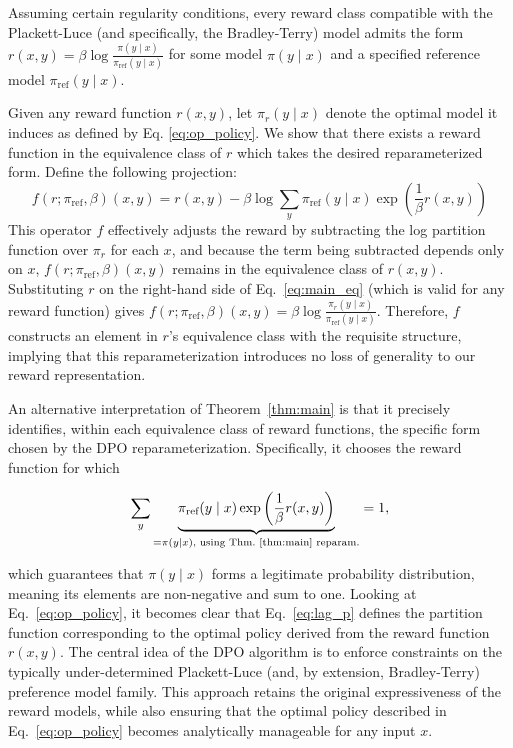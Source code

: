 \begin{theorem}\label{thm:main}
    Assuming certain regularity conditions, every reward class compatible with the Plackett-Luce (and specifically, the Bradley-Terry) model admits the form ${r(x, y) = \beta \log \frac{\pi(y\mid x)}{\pi_\text{ref}(y\mid x)}}$ for some model $\pi(y\mid x)$ and a specified reference model $\pi_\text{ref}(y \mid x)$.
\end{theorem}

\begin{sproof}
    Given any reward function $r(x, y)$, let $\pi_r(y \mid x)$ denote the optimal model it induces as defined by Eq. \ref{eq:op_policy}. We show that there exists a reward function in the equivalence class of $r$ which takes the desired reparameterized form. Define the following projection:
\begin{equation}
    f(r; \pi_\text{ref}, \beta)(x, y) = r(x, y) - \beta\log\sum_{y}\pi_\text{ref}(y\mid x)\exp\left(\frac{1}{\beta}r(x, y)\right)
\end{equation}
This operator $f$ effectively adjusts the reward by subtracting the log partition function over $\pi_r$ for each $x$, and because the term being subtracted depends only on $x$, $f(r; \pi_\text{ref}, \beta)(x, y)$ remains in the equivalence class of $r(x, y)$. Substituting $r$ on the right-hand side of Eq.~\ref{eq:main_eq} (which is valid for any reward function) gives $f(r; \pi_\text{ref}, \beta)(x, y) = \beta \log \frac{\pi_r(y\mid x)}{\pi_\text{ref}(y\mid x)}$. Therefore, $f$ constructs an element in $r$'s equivalence class with the requisite structure, implying that this reparameterization introduces no loss of generality to our reward representation.
\end{sproof}

An alternative interpretation of Theorem~\ref{thm:main} is that it precisely identifies, within each equivalence class of reward functions, the specific form chosen by the DPO reparameterization. Specifically, it chooses the reward function for which

\begin{equation}\label{eq:lag_p}
     \sum_{y}\underbrace{\pi_\text{ref}(y\mid x)\exp\left(\frac{1}{\beta}r(x, y)\right)}_{=\pi(y\mid x)\text{, using Thm.~\ref{thm:main} reparam.}} = 1,
\end{equation}

which guarantees that $\pi(y\mid x)$ forms a legitimate probability distribution, meaning its elements are non-negative and sum to one. Looking at Eq.~\ref{eq:op_policy}, it becomes clear that Eq.~\ref{eq:lag_p} defines the partition function corresponding to the optimal policy derived from the reward function $r(x, y)$. The central idea of the DPO algorithm is to enforce constraints on the typically under-determined Plackett-Luce (and, by extension, Bradley-Terry) preference model family. This approach retains the original expressiveness of the reward models, while also ensuring that the optimal policy described in Eq.~\ref{eq:op_policy} becomes analytically manageable for any input $x$.

